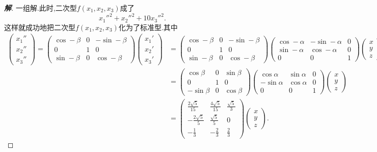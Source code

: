 \documentclass[a4paper]{article}
\begin{document}
\begin{proof}[\textbf{解}]
一组解.此时,二次型$f(x_1,x_2,x_3)$成了
$$
x_1''^2+x_2''^2+10x_3''^2.
$$
这样就成功地把二次型$f(x_1,x_2,x_3)$化为了标准型.其中
\begin{align*}
  \begin{pmatrix}
    x_1''\\
    x_2''\\
    x_3''
  \end{pmatrix}=\begin{pmatrix}
    \cos-\beta&0&-\sin-\beta\\
    0&1&0\\
    \sin-\beta&0&\cos-\beta
  \end{pmatrix}
  \begin{pmatrix}
    x_1'\\
    x_2'\\
    x_3'
  \end{pmatrix}&=\begin{pmatrix}
    \cos-\beta&0&-\sin-\beta\\
    0&1&0\\
    \sin-\beta&0&\cos-\beta
  \end{pmatrix}\begin{pmatrix}
    \cos-\alpha&-\sin-\alpha&0\\
    \sin-\alpha&\cos-\alpha&0\\
    0&0&1
  \end{pmatrix}
  \begin{pmatrix}
    x\\
    y\\
    z
  \end{pmatrix}\\&=\begin{pmatrix}
    \cos\beta&0&\sin\beta\\
    0&1&0\\
    -\sin\beta&0&\cos\beta
  \end{pmatrix}\begin{pmatrix}
    \cos\alpha&\sin\alpha&0\\
    -\sin\alpha&\cos\alpha&0\\
    0&0&1
  \end{pmatrix}
  \begin{pmatrix}
    x\\
    y\\
    z
  \end{pmatrix}\\&=
  \begin{pmatrix}
    \frac{2 \sqrt{5}}{15}&\frac{4 \sqrt{5}}{15}&\frac{\sqrt{5}}{3}\\
    -\frac{2 \sqrt{5}}{5}&\frac{\sqrt{5}}{5}&0\\
    -\frac{1}{3}&-\frac{2}{3}&\frac{2}{3}
  \end{pmatrix}
  \begin{pmatrix}
    x\\
    y\\
    z
  \end{pmatrix}.
\end{align*}
\end{proof}
\end{document}

